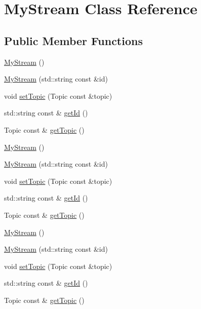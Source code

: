 \hypertarget{class_my_stream}{}\section{My\+Stream Class Reference}
\label{class_my_stream}
\subsection*{Public Member Functions}
\begin{DoxyCompactItemize}
\item 
\hyperlink{class_my_stream_aadbb14388e06768529e8e3af54f96f3e}{My\+Stream} ()
\item 
\hyperlink{class_my_stream_a0cb8c5084d6122efb669757eb3dc51df}{My\+Stream} (std\+::string const \&id)
\item 
void \hyperlink{class_my_stream_a7b043c20b59a3350d2b110fe513d27f9}{set\+Topic} (Topic const \&topic)
\item 
std\+::string const \& \hyperlink{class_my_stream_a08446154f53d9d882d2c24eee4187fca}{get\+Id} ()
\item 
Topic const \& \hyperlink{class_my_stream_a46fec149b460ceffffdd82b2a8f2e38c}{get\+Topic} ()
\item 
\hyperlink{class_my_stream_aadbb14388e06768529e8e3af54f96f3e}{My\+Stream} ()
\item 
\hyperlink{class_my_stream_a0cb8c5084d6122efb669757eb3dc51df}{My\+Stream} (std\+::string const \&id)
\item 
void \hyperlink{class_my_stream_a7b043c20b59a3350d2b110fe513d27f9}{set\+Topic} (Topic const \&topic)
\item 
std\+::string const \& \hyperlink{class_my_stream_a08446154f53d9d882d2c24eee4187fca}{get\+Id} ()
\item 
Topic const \& \hyperlink{class_my_stream_a46fec149b460ceffffdd82b2a8f2e38c}{get\+Topic} ()
\item 
\hyperlink{class_my_stream_aadbb14388e06768529e8e3af54f96f3e}{My\+Stream} ()
\item 
\hyperlink{class_my_stream_a0cb8c5084d6122efb669757eb3dc51df}{My\+Stream} (std\+::string const \&id)
\item 
void \hyperlink{class_my_stream_a7b043c20b59a3350d2b110fe513d27f9}{set\+Topic} (Topic const \&topic)
\item 
std\+::string const \& \hyperlink{class_my_stream_a08446154f53d9d882d2c24eee4187fca}{get\+Id} ()
\item 
Topic const \& \hyperlink{class_my_stream_a46fec149b460ceffffdd82b2a8f2e38c}{get\+Topic} ()
\end{DoxyCompactItemize}


